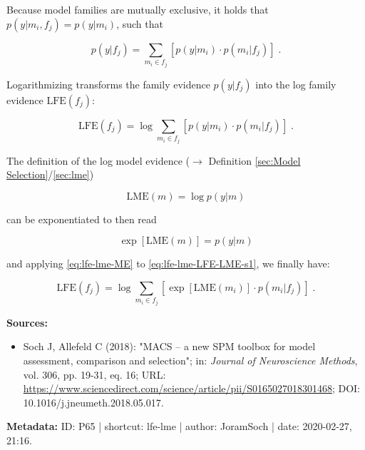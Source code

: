 \documentclass[a4paper,12pt,twoside]{book}
\begin{document}
Because model families are mutually exclusive, it holds that $p(y \vert m_i,f_j) = p(y \vert m_i)$, such that

\begin{equation} \label{eq:lfe-lme-FE-ME-s2}
p(y|f_j) = \sum_{m_i \in f_j} \left[ p(y|m_i) \cdot p(m_i|f_j) \right] \; .
\end{equation}

Logarithmizing transforms the family evidence $p(y \vert f_j)$ into the log family evidence $\mathrm{LFE}(f_j)$:

\begin{equation} \label{eq:lfe-lme-LFE-LME-s1}
\mathrm{LFE}(f_j) = \log \sum_{m_i \in f_j} \left[ p(y|m_i) \cdot p(m_i|f_j) \right] \; .
\end{equation}

The definition of the log model evidence ($\rightarrow$ Definition \ref{sec:Model Selection}/\ref{sec:lme})

\begin{equation} \label{eq:lfe-lme-LME}
\mathrm{LME}(m) = \log p(y|m)
\end{equation}

can be exponentiated to then read

\begin{equation} \label{eq:lfe-lme-ME}
\exp\left[ \mathrm{LME}(m) \right] = p(y|m)
\end{equation}

and applying \eqref{eq:lfe-lme-ME} to \eqref{eq:lfe-lme-LFE-LME-s1}, we finally have:

\begin{equation} \label{eq:lfe-lme-LFE-LME-s2}
\mathrm{LFE}(f_j) = \log \sum_{m_i \in f_j} \left[ \exp[\mathrm{LME}(m_i)] \cdot p(m_i|f_j) \right] \; .
\end{equation}


\vspace{1em}
\textbf{Sources:}
\begin{itemize}
\item Soch J, Allefeld C (2018): "MACS – a new SPM toolbox for model assessment, comparison and selection"; in: \textit{Journal of Neuroscience Methods}, vol. 306, pp. 19-31, eq. 16; URL: \url{https://www.sciencedirect.com/science/article/pii/S0165027018301468}; DOI: 10.1016/j.jneumeth.2018.05.017.
\end{itemize}


\vspace{1em}
\textbf{Metadata:} ID: P65 | shortcut: lfe-lme | author: JoramSoch | date: 2020-02-27, 21:16.
\vspace{1em}
\end{document}
